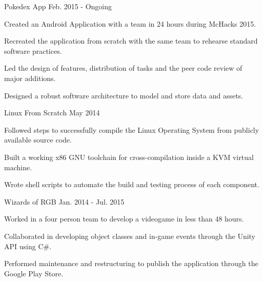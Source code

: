 \begin{cventries}
  \cventry
    {Pokedex App} %
    {} %
    {} %
    {Feb. 2015 - Ongoing} %
    {
      \begin{cvitems} %
        \item {Created an Android Application with a team in 24 hours during McHacks 2015.}
        \item {Recreated the application from scratch with the same team to rehearse standard software practices.}
        \item {Led the design of features, distribution of tasks and the peer code review of major additions.}
        \item {Designed a robust software architecture to model and store data and assets.}
        \\
      \end{cvitems}
    } 

  \cventry
    {Linux From Scratch} %
    {} %
    {} %
    {May 2014} %
    {
      \begin{cvitems} %
        \item {Followed steps to successfully compile the Linux Operating System from publicly available source code.}
        \item {Built a working x86 GNU toolchain for cross-compilation inside a KVM virtual machine.}
        \item {Wrote shell scripts to automate the build and testing process of each component.}
        \\
      \end{cvitems}
    } 

  \cventry
    {Wizards of RGB} %
    {} %
    {} %
    {Jan. 2014 - Jul. 2015} %
    {
      \begin{cvitems} %
        \item {Worked in a four person team to develop a videogame in less than 48 hours.}
        \item {Collaborated in developing object classes and in-game events through the Unity API using C\#.}
        \item {Performed maintenance and restructuring to publish the application through the Google Play Store.}
        \\
      \end{cvitems}
    } 
\end{cventries}
